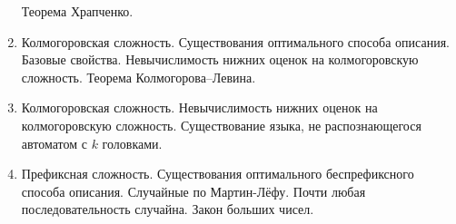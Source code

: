 \begin{enumerate}
        Теорема Храпченко.
    \item Колмогоровская сложность. Существования оптимального способа описания. Базовые
        свойства. Невычислимость нижних оценок на колмогоровскую сложность. Теорема Колмогорова--Левина.
    \item Колмогоровская сложность. Невычислимость нижних оценок на колмогоровскую
        сложность. Существование языка, не распознающегося автоматом с $k$ головками.
    \item Префиксная сложность. Существования оптимального беспрефиксного способа описания.
        Случайные по Мартин-Лёфу. Почти любая последовательность случайна. Закон больших чисел.
\end{enumerate}





